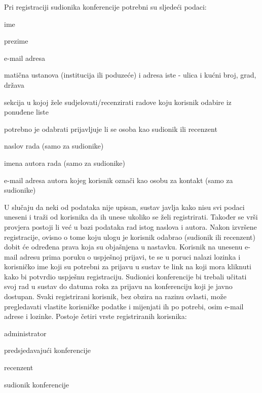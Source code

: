 		\newline
		\newline
		Pri registraciji sudionika konferencije potrebni su sljedeći podaci:

		\begin{packed_item}

			\item ime
			\item prezime
			\item e-mail adresa
			\item matična ustanova (institucija ili poduzeće) i adresa iste - ulica i kućni broj, grad, država
			\item sekcija u kojoj žele sudjelovati/recenzirati radove koju korisnik odabire iz ponuđene liste
			\item potrebno je odabrati prijavljuje li se osoba kao sudionik ili recenzent
			\item naslov rada (samo za sudionike)
			\item imena autora rada (samo za sudionike)
			\item e-mail adresa autora kojeg korisnik označi kao osobu za kontakt (samo za sudionike)
		
		\end{packed_item}
	
		U slučaju da neki od podataka nije upisan, sustav javlja kako nisu svi podaci uneseni i traži od korisnika da ih unese ukoliko se želi registrirati. Također se vrši provjera postoji li već u bazi podataka rad istog naslova i autora. Nakon izvršene registracije, ovisno o tome koju ulogu je korisnik odabrao (sudionik ili recenzent) dobit će određena prava koja su objašnjena u nastavku. Korisnik na unesenu e-mail adresu prima poruku o uspješnoj prijavi, te se u poruci nalazi lozinka i korisničko ime koji su potrebni za prijavu u sustav te link na koji mora kliknuti kako bi potvrdio uspješnu registraciju. Sudionici konferencije bi trebali učitati svoj rad u sustav do datuma roka za prijavu na konferenciju koji je javno dostupan.
		\newline
		\newline
		Svaki registrirani korisnik, bez obzira na razinu ovlasti, može pregledavati vlastite korisničke podatke i mijenjati ih po potrebi, osim e-mail adrese i lozinke. 
		\newline
		\newline
		Postoje četiri vrste registriranih korisnika:
		\begin{packed_item}
			
			\item administrator
			\item predsjedavajući konferencije
			\item recenzent
			\item sudionik konferencije
			
		\end{packed_item}
	
